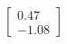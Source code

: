 \documentclass[preview]{standalone}
\begin{document}
\begin{align*}
\begin{bmatrix} 0.47 \\ -1.08 \end{bmatrix}
\end{align*}
\end{document}
